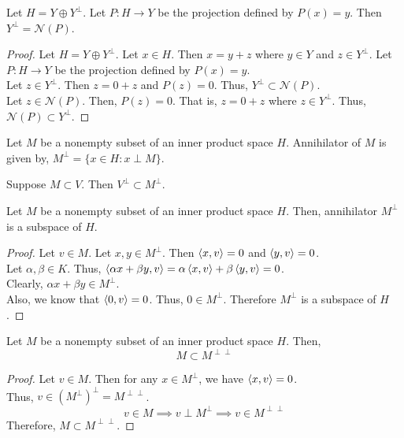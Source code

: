 \begin{lemma}
	Let $H = Y \oplus Y^\perp$.
	Let $P : H \to Y$ be the projection defined by $P(x) = y$.
	Then $Y^\perp = \mathcal{N}(P)$.
\end{lemma}
\begin{proof}
	Let $H = Y \oplus Y^\perp$.
	Let $x \in H$.
	Then $x = y+z$ where $y \in Y$ and $z \in Y^\perp$.
	Let $P : H \to Y$ be the projection defined by $P(x) = y$.\\

	Let $z \in Y^\perp$.
	Then $z = 0+z$ and $P(z) = 0$.
	Thus, $Y^\perp \subset \mathcal{N}(P)$.\\

	Let $z \in \mathcal{N}(P)$.
	Then, $P(z) = 0$.
	That is, $z = 0+z$ where $z \in Y^\perp$.
	Thus, $\mathcal{N}(P) \subset Y^\perp$.
\end{proof}

\begin{definition}[Annihilator]
	Let $M$ be a nonempty subset of an inner product space $H$.
	Annihilator of $M$ is given by, $M^\perp = \{ x \in H : x \perp M \}$.
\end{definition}

\begin{commentary}
	\begin{remark}
	Suppose $M \subset V$. Then $V^\perp \subset M^\perp$.
	\end{remark}
\end{commentary}


\begin{remark}
	Let $M$ be a nonempty subset of an inner product space $H$.
	Then, annihilator $M^\perp$ is a subspace of $H$.
\end{remark}
\begin{proof}
	Let $v \in M$.
	Let $x,y \in M^\perp$.
	Then $\left\langle x,v \right\rangle = 0$ and $\left\langle y,v \right\rangle = 0$.\\
	Let $\alpha,\beta \in K$.
	Thus, $\left\langle \alpha x +\beta y,v \right\rangle = \alpha \left\langle x,v \right\rangle + \beta \left\langle y,v \right\rangle = 0$.\\
	Clearly, $\alpha x + \beta y \in M^\perp$.\\

	Also, we know that $\left\langle 0,v \right\rangle = 0$.
	Thus, $0 \in M^\perp$.
	Therefore $M^\perp$ is a subspace of $H$.
\end{proof}

\begin{remark}
	Let $M$ be a nonempty subset of an inner product space $H$.
	Then,
	\[ M \subset M^{\perp\perp} \]
\end{remark}
\begin{proof}
	Let $v \in M$.
	Then for any $x \in M^\perp$, we have $\left\langle x,v \right\rangle = 0$.\\
	Thus, $v \in (M^\perp)^\perp = M^{\perp\perp}$.
	\[ v \in M \implies v \perp M^\perp \implies v \in M^{\perp\perp} \]
	Therefore, $M \subset M^{\perp\perp}$.
\end{proof}


